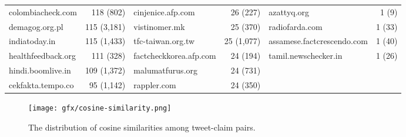 \documentclass[sigconf,natbib=true,anonymous=false,nonacm]{acmart}
\begin{document}
\begin{table*}[h]
\begin{center}
\begin{tabular}{lr | lr | lr}
            colombiacheck.com & 118 (802) & cinjenice.afp.com & 26 (227) & azattyq.org & 1 (9) \\
            demagog.org.pl & 115 (3,181) & vistinomer.mk & 25 (370) & radiofarda.com & 1 (33) \\
            indiatoday.in & 115 (1,433) & tfc-taiwan.org.tw & 25 (1,077) & assamese.factcrescendo.com & 1 (40) \\
            healthfeedback.org & 111 (328) & factcheckkorea.afp.com & 24 (194) & tamil.newschecker.in & 1 (26) \\
            hindi.boomlive.in & 109 (1,372) & malumatfurus.org & 24 (731) \\
            cekfakta.tempo.co & 95 (1,142) & rappler.com & 24 (350) \\

            \bottomrule

        \end{tabular}
        \label{tab:reviewers}
    \end{center}
\end{table*}

\begin{figure}[H]
    \begin{center}
        \texttt{[image: gfx/cosine-similarity.png]}
    \end{center}
    \caption{The distribution of cosine similarities among tweet-claim pairs.}
    \label{fig:cosine-similarity}
\end{figure}

\fi
\end{document}
